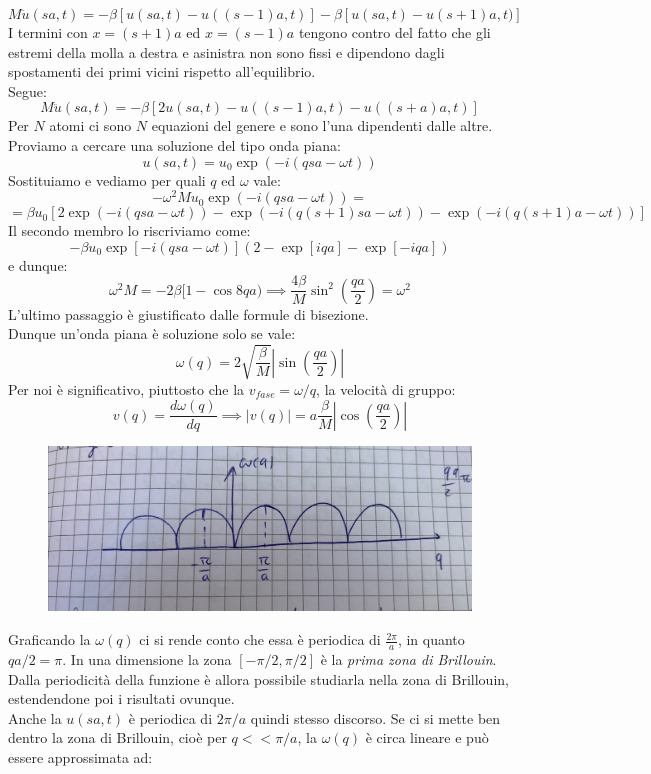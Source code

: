 \documentclass{book}
\begin{document}
        $$M \ddot{u} (sa, t) = -\beta [u(sa,t)-u((s-1)a,t)]-\beta [u(sa,t)-u(s+1)a,t)]$$
        I termini con $x=(s+1)a$ ed $x=(s-1)a$ tengono contro del fatto che gli estremi della molla a destra e asinistra non sono fissi e dipendono dagli spostamenti dei primi vicini rispetto all'equilibrio.\\
        Segue:
        $$M\ddot{u}(sa,t) = - \beta [2u(sa,t) -u((s-1)a,t)-u((s+a)a,t)]$$
        Per $N$ atomi ci sono $N$ equazioni del genere e sono l'una dipendenti dalle altre.\\
        Proviamo a cercare una soluzione del tipo onda piana:
        $$u(sa,t) = u_{0}\exp{(-i(qsa-\omega t))}$$
        Sostituiamo e vediamo per quali $q$ ed $\omega$ vale:
        $$-\omega ^{2} M u_{0} \exp{(-i(qsa-\omega t))}=$$
        $$ =\beta u_{0}[2\exp{(-i(qsa-\omega t))}-\exp{(-i(q(s+1)sa-\omega t))}-\exp{(-i(q(s+1)a-\omega t))}]$$
        Il secondo membro lo riscriviamo come:
        $$- \beta u_{0}\exp[{-i(qsa-\omega t)}] (2-\exp{[iqa]}-\exp{[-iqa]})$$
        e dunque:
        $$\omega^{2}M = -2\beta [1-\cos{8qa)} \implies \frac{4\beta}{M}\sin^{2}(\frac{qa}{2})= \omega ^{2}$$
        L'ultimo passaggio è giustificato dalle formule di bisezione.\\
        Dunque un'onda piana è soluzione solo se vale:
        $$\omega(q) = 2 \sqrt{\frac{\beta}{M}}|\sin{(\frac{qa}{2})}|$$
        Per noi è significativo, piuttosto che la $v_{fase} = \omega/q$, la velocità di gruppo:
        $$v(q) = \frac{d \omega(q)}{dq} \implies |v(q)|=a \frac{\beta}{M}|\cos{(\frac{qa}{2})}|$$
        \begin{figure}[h!]
            \centering
            \includegraphics[width=0.5\linewidth]{img/imnothere3.png}
        \end{figure}
        Graficando la $\omega(q)$ ci si rende conto che essa è periodica di $\displaystyle\frac{2\pi}{a}$, in quanto $qa/2 = \pi$. In una dimensione la zona $[-\pi/2, \pi/2]$ è la \textit{prima zona di Brillouin}. Dalla periodicità della funzione è allora possibile studiarla nella zona di Brillouin, estendendone poi i risultati ovunque.\\
        Anche la $u(sa,t)$ è periodica di $2\pi/a$ quindi stesso discorso. Se ci si mette ben dentro la zona di Brillouin, cioè per $q << \pi/a$, la $\omega(q)$ è circa lineare e può essere approssimata ad:
\end{document}
